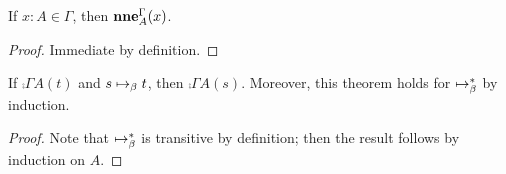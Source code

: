 \documentclass[a4paper]{article}
\begin{document}
\begin{theorem}[\cref{ax:0002}]\label{thm:0003}
  If $x : A \in \Gamma$, then $\operatorname{\mathbf{nne}}^{\Gamma}_{A}(x)$.
\end{theorem}
\begin{proof}
  Immediate by definition.
\end{proof}

\begin{theorem}[\cref{ax:0003}]\label{thm:1010}
  If $\comp{\Gamma}{A}(t)$ and $s \bRed t$, then $\comp{\Gamma}{A}(s)$.
  Moreover, this theorem holds for $\bRed*$ by induction.
\end{theorem}
\begin{proof}
  Note that $\bRed*$ is transitive by definition; then the result follows by induction on $A$.
\end{proof}
\end{document}
